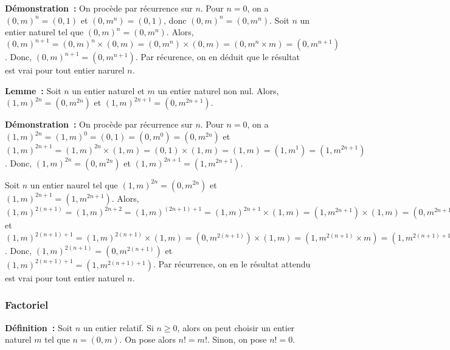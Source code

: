 \noindent\textbf{Démonstration :} On procède par récurrence sur $n$.
    Pour $n = 0$, on a $(0,m)^n = (0,1)$ et $(0,m^n) = (0,1)$, donc $(0,m)^n = (0,m^n)$.
    Soit $n$ un entier naturel tel que $(0,m)^n = (0,m^n)$. 
    Alors, $(0,m)^{n+1} = (0,m)^n \times (0,m) = (0,m^n) \times (0,m) = (0, m^n \times m) = (0, m^{n+1})$. 
    Donc, $(0,m)^{n+1} = (0,m^{n+1})$.
    Par récurence, on en déduit que le résultat est vrai pour tout entier narurel $n$.

   \done 

\medskip

\noindent\textbf{Lemme :} Soit $n$ un entier naturel et $m$ un entier naturel non nul. 
    Alors, $(1,m)^{2n} = (0,m^{2n})$ et $(1,m)^{2n+1} = (0,m^{2n+1})$.

\medskip

\noindent\textbf{Démonstration :} On procède par récurrence sur $n$.
    Pour $n = 0$, on a $(1,m)^{2n} = (1,m)^0 = (0,1) = (0,m^0) = (0,m^{2 n})$ et $(1,m)^{2n+1} = (1,m)^{2 n} \times (1,m) = (0,1) \times (1,m) = (1,m) = (1,m^1) = (1,m^{2 n + 1})$. 
    Donc, $(1,m)^{2n} = (0,m^{2 n})$ et $(1,m)^{2n+1} = (1,m^{2 n + 1})$. 
    
    Soit $n$ un entier naurel tel que $(1,m)^{2n} = (0,m^{2 n})$ et $(1,m)^{2n+1} = (1,m^{2 n + 1})$. 
    Alors, $(1,m)^{2(n+1)} = (1,m)^{2n + 2} = (1,m)^{(2n+1)+1} = (1,m)^{2n+1} \times (1,m) = (1, m^{2n+1}) \times (1,m) = (0,m^{2n+1} \times m) = (0, m^{2n+1+1}) = (0, m^{2(n+1)})$ et $(1,m)^{2(n+1)+1} = (1,m)^{2(n+1)} \times (1,m) = (0, m^{2(n+1)}) \times (1,m) = (1,m^{2(n+1)} \times m) = (1, m^{2(n+1)+1})$. 
    Donc, $(1,m)^{2(n+1)} = (0, m^{2(n+1)})$ et $(1,m)^{2(n+1)+1} = (1, m^{2(n+1)+1})$. 
    Par récurrence, on en le résultat attendu est vrai pour tout entier naturel $n$.

   \done 

\subsubsection{Factoriel}

\noindent\textbf{Définition :} Soit $n$ un entier relatif. 
    Si $n \geq 0$, alors on peut choisir un entier naturel $m$ tel que $n = (0,m)$. 
    On pose alors $n! = m!$. 
    Sinon, on pose $n! = 0$.
